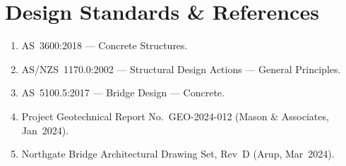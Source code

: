 \section{Design Standards \& References}
\begin{enumerate}[leftmargin=*,itemsep=3pt,topsep=4pt]
  \item AS~3600:2018 --- Concrete Structures.
  \item AS/NZS~1170.0:2002 --- Structural Design Actions --- General Principles.
  \item AS~5100.5:2017 --- Bridge Design --- Concrete.
  \item Project Geotechnical Report No.\ GEO-2024-012 (Mason \& Associates, Jan~2024).
  \item Northgate Bridge Architectural Drawing Set, Rev~D (Arup, Mar~2024).
\end{enumerate}

